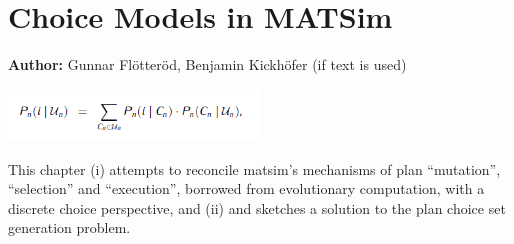 \chapter{Choice Models in MATSim}
\label{ch:discretechoice}

\hfill \textbf{Author:} Gunnar Flötteröd, Benjamin Kickhöfer (if text is used)


\begin{center} \includegraphics[width=0.5\textwidth, angle=0]{understanding/figures/dc.png} \end{center}

This chapter (i) attempts to reconcile \gls{matsim}'s mechanisms of plan
{}``mutation'', {}``selection'' and {}``execution'', borrowed from evolutionary computation, with a 
discrete choice perspective, and (ii) and sketches a solution to the
plan choice set generation problem.

